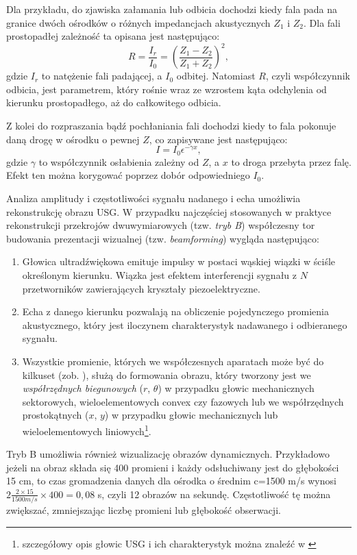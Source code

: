 Dla przykładu, do zjawiska załamania lub odbicia dochodzi kiedy fala pada na granice dwóch ośrodków o różnych impedancjach akustycznych $Z_1$ i $Z_2$. Dla fali prostopadłej zależność ta opisana jest następująco:
\begin{equation}
R = \frac{I_r}{I_0} = \left(\frac{Z_1-Z_2}{Z_1+Z_2}\right)^2,
\end{equation}
gdzie $I_r$ to natężenie fali padającej, a $I_0$ odbitej. Natomiast $R$, czyli współczynnik odbicia, jest parametrem, który rośnie wraz ze wzrostem kąta odchylenia od kierunku prostopadłego, aż do całkowitego odbicia.

Z kolei do rozpraszania bądź pochłaniania fali dochodzi kiedy to fala pokonuje daną drogę w ośrodku o pewnej $Z$, co zapisywane jest następująco:
\begin{equation}
I=I_0 \epsilon^{-\gamma x},
\end{equation}
gdzie $\gamma$ to współczynnik osłabienia zależny od $Z$, a $x$ to droga przebyta przez falę. Efekt ten można korygować poprzez dobór odpowiedniego $I_0$.

Analiza amplitudy i częstotliwości sygnału nadanego i echa umożliwia rekonstrukcję obrazu USG. W przypadku najczęściej stosowanych w praktyce rekonstrukcji przekrojów dwuwymiarowych (tzw. \textit{tryb B}) współczesny tor budowania prezentacji wizualnej (tzw. \textit{beamforming}) wygląda następująco: 
\begin{enumerate}
	\item Głowica ultradźwiękowa emituje impulsy w postaci wąskiej wiązki w ściśle określonym kierunku. Wiązka jest efektem interferencji sygnału z $N$ przetworników zawierających kryształy piezoelektryczne.
	\item Echa z danego kierunku pozwalają na obliczenie pojedynczego promienia akustycznego, który jest iloczynem charakterystyk nadawanego i odbieranego sygnału.
	\item Wszystkie promienie, których we współczesnych aparatach może być do kilkuset (zob. \cite{GEVoluson}), służą do formowania obrazu, który tworzony jest we \textit{współrzędnych biegunowych} ($r$, $\theta$) w przypadku głowic mechanicznych sektorowych, wieloelementowych convex czy fazowych lub we współrzędnych prostokątnych ($x$, $y$) w przypadku głowic mechanicznych lub wieloelementowych liniowych\footnote{szczegółowy opis głowic USG i ich charakterystyk można znaleźć w \cite{GlowiceUSG}}. 
\end{enumerate}

Tryb B umożliwia również wizualizację obrazów dynamicznych. Przykładowo jeżeli na obraz składa się 400 promieni i każdy odsłuchiwany jest do głębokości 15 cm, to czas gromadzenia danych dla ośrodka o średnim c=1500 m/s wynosi $2\frac{2\times15}{1500 m/s}\times400 = 0,08$ s, czyli 12 obrazów na sekundę. Częstotliwość tę można zwiększać, zmniejszając liczbę promieni lub głębokość obserwacji.

